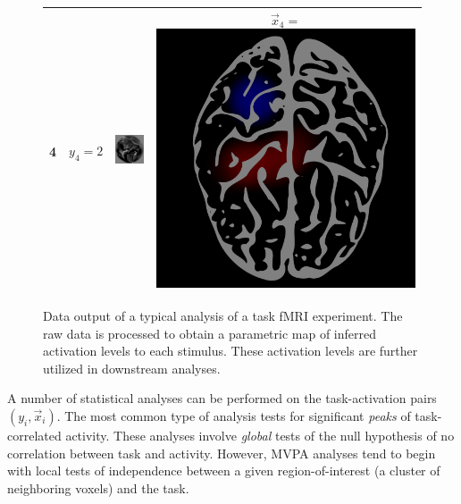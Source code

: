 \begin{figure}
\begin{tabular}{|c|cc|c|}
4 & $y_4 = 2$ & \includegraphics[scale = 0.26]{../../proposal/img4.png} & $\vec{x}_4 = $\includegraphics[scale = 0.035]{../../proposal/brain8.png} \\ \hline
\end{tabular}
\caption{Data output of a typical analysis of a task fMRI experiment.
  The raw data is processed to obtain a parametric map of inferred
  activation levels to each stimulus.  These activation levels are
  further utilized in downstream analyses. }
\label{fig:task_fmri}
\end{figure}

A number of statistical analyses can be performed on the
task-activation pairs $(y_i, \vec{x}_i)$.  The most common type of
analysis tests for significant \emph{peaks} of task-correlated
activity.  These analyses involve \emph{global} tests of the null
hypothesis of no correlation between task and activity.  However, MVPA
analyses tend to begin with local tests of independence between a
given region-of-interest (a cluster of neighboring voxels) and the
task.


